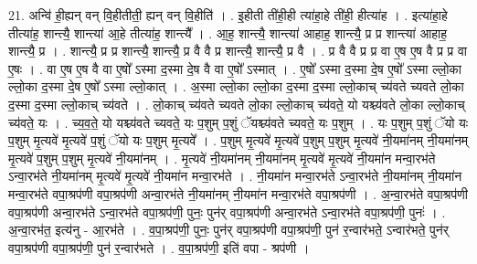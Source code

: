 \documentclass[17pt]{extarticle}
\begin{document}
21. अन्वि॑ ही॒ह्यन् वन् वि॒हीतीती॒ ह्यन् वन् वि॒हीति॑ । . इ॒हीती ती॑ही॒ही त्या॑हा॒हे ती॑ही॒ हीत्या॑ह । . इत्या॑हा॒हे तीत्या॑ह॒ शान्त्यै॒ शान्त्या॑ आ॒हे तीत्या॑ह॒ शान्त्यै᳚ । . आ॒ह॒ शान्त्यै॒ शान्त्या॑ आहाह॒ शान्त्यै॒ प्र प्र शान्त्या॑ आहाह॒ शान्त्यै॒ प्र । . शान्त्यै॒ प्र प्र शान्त्यै॒ शान्त्यै॒ प्र वै वै प्र शान्त्यै॒ शान्त्यै॒ प्र वै । . प्र वै वै प्र प्र वा ए॒ष ए॒ष वै प्र प्र वा ए॒षः । . वा ए॒ष ए॒ष वै वा ए॒षो᳚ ऽस्मा द॒स्मा दे॒ष वै वा ए॒षो᳚ ऽस्मात् । . ए॒षो᳚ ऽस्मा द॒स्मा दे॒ष ए॒षो᳚ ऽस्मा ल्लो॒का ल्लो॒का द॒स्मा दे॒ष ए॒षो᳚ ऽस्मा ल्लो॒कात् । . अ॒स्मा ल्लो॒का ल्लो॒का द॒स्मा द॒स्मा ल्लो॒काच् च्य॑वते च्यवते लो॒का द॒स्मा द॒स्मा ल्लो॒काच् च्य॑वते । . लो॒काच् च्य॑वते च्यवते लो॒का ल्लो॒काच् च्य॑वते॒ यो यश्च्य॑वते लो॒का ल्लो॒काच् च्य॑वते॒ यः । . च्य॒व॒ते॒ यो यश्च्य॑वते च्यवते॒ यः प॒शुम् प॒शुं ॅयश्च्य॑वते च्यवते॒ यः प॒शुम् । . यः प॒शुम् प॒शुं ॅयो यः प॒शुम् मृ॒त्यवे॑ मृ॒त्यवे॑ प॒शुं ॅयो यः प॒शुम् मृ॒त्यवे᳚ । . प॒शुम् मृ॒त्यवे॑ मृ॒त्यवे॑ प॒शुम् प॒शुम् मृ॒त्यवे॑ नी॒यमा॑नम् नी॒यमा॑नम् मृ॒त्यवे॑ प॒शुम् प॒शुम् मृ॒त्यवे॑ नी॒यमा॑नम् । . मृ॒त्यवे॑ नी॒यमा॑नम् नी॒यमा॑नम् मृ॒त्यवे॑ मृ॒त्यवे॑ नी॒यमा॑न मन्वा॒रभ॑ते ऽन्वा॒रभ॑ते नी॒यमा॑नम् मृ॒त्यवे॑ मृ॒त्यवे॑ नी॒यमा॑न मन्वा॒रभ॑ते । . नी॒यमा॑न मन्वा॒रभ॑ते ऽन्वा॒रभ॑ते नी॒यमा॑नम् नी॒यमा॑न मन्वा॒रभ॑ते वपा॒श्रप॑णी वपा॒श्रप॑णी अन्वा॒रभ॑ते नी॒यमा॑नम् नी॒यमा॑न मन्वा॒रभ॑ते वपा॒श्रप॑णी । . अ॒न्वा॒रभ॑ते वपा॒श्रप॑णी वपा॒श्रप॑णी अन्वा॒रभ॑ते ऽन्वा॒रभ॑ते वपा॒श्रप॑णी॒ पुनः॒ पुन॑र् वपा॒श्रप॑णी अन्वा॒रभ॑ते ऽन्वा॒रभ॑ते वपा॒श्रप॑णी॒ पुनः॑ । . अ॒न्वा॒रभ॑त॒ इत्य॑नु - आ॒रभ॑ते । . व॒पा॒श्रप॑णी॒ पुनः॒ पुन॑र् वपा॒श्रप॑णी वपा॒श्रप॑णी॒ पुन॑ र॒न्वार॑भते॒ ऽन्वार॑भते॒ पुन॑र् वपा॒श्रप॑णी वपा॒श्रप॑णी॒ पुन॑ र॒न्वार॑भते । . व॒पा॒श्रप॑णी॒ इति॑ वपा - श्रप॑णी । \newline
\end{document}
